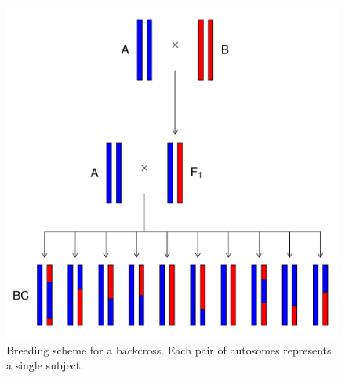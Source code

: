 \documentclass[]{article}\usepackage[]{graphicx}\usepackage[]{color}
\makeatletter
\def\maxwidth{ %
  \ifdim\Gin@nat@width>\linewidth
    \linewidth
  \else
    \Gin@nat@width
  \fi
}
\newenvironment{knitrout}{}{} %
\def\maxwidth{\ifdim\Gin@nat@width>\linewidth\linewidth\else\Gin@nat@width\fi}
\makeatother
\begin{document}
\begin{knitrout}
\color{fgcolor}\begin{figure}
\includegraphics[width=\maxwidth]{figure/backcross-1} \caption[Breeding scheme for a backcross]{Breeding scheme for a backcross. Each pair of autosomes represents a single subject.}\label{fig:backcross}
\end{figure}


\end{knitrout}
\end{document}
